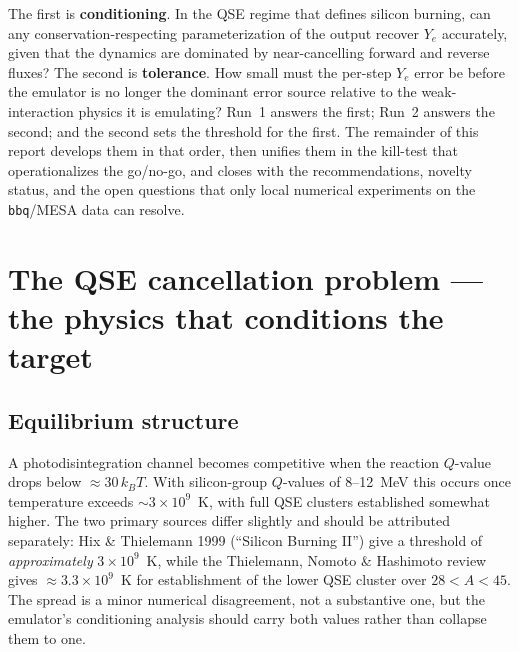 \documentclass[11pt]{article}
\begin{document}
The first is \textbf{conditioning}. In the QSE regime that defines silicon burning, can any conservation-respecting parameterization of the output recover $Y_e$ accurately, given that the dynamics are dominated by near-cancelling forward and reverse fluxes? The second is \textbf{tolerance}. How small must the per-step $Y_e$ error be before the emulator is no longer the dominant error source relative to the weak-interaction physics it is emulating? Run~1 answers the first; Run~2 answers the second; and the second sets the threshold for the first. The remainder of this report develops them in that order, then unifies them in the kill-test that operationalizes the go/no-go, and closes with the recommendations, novelty status, and the open questions that only local numerical experiments on the \texttt{bbq}/MESA data can resolve.

\section{The QSE cancellation problem --- the physics that conditions the target}

\subsection{Equilibrium structure}

A photodisintegration channel becomes competitive when the reaction $Q$-value drops below $\approx 30\,k_B T$. With silicon-group $Q$-values of 8--12~MeV this occurs once temperature exceeds $\sim 3\times10^9$~K, with full QSE clusters established somewhat higher. The two primary sources differ slightly and should be attributed separately: Hix \& Thielemann 1999 (``Silicon Burning II'') give a threshold of \emph{approximately} $3\times10^9$~K, while the Thielemann, Nomoto \& Hashimoto review gives $\approx 3.3\times10^9$~K for establishment of the lower QSE cluster over $28 < A < 45$. The spread is a minor numerical disagreement, not a substantive one, but the emulator's conditioning analysis should carry both values rather than collapse them to one.
\end{document}
